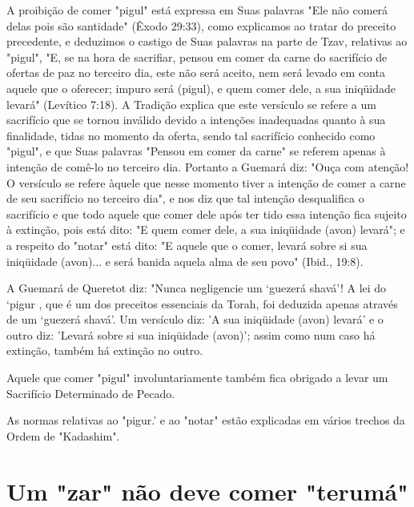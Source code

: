 \begin{itemize}
\begin{enumrate}
\begin{itemize}
\begin{itemize}
\begin{itemize}
A proibição de comer "pigul" está expressa em Suas palavras "Ele não
comerá delas pois são santidade" (Êxodo 29:33), como explicamos ao
tra­tar do preceito precedente, e deduzimos o castigo de Suas palavras
na parte de Tzav, relativas ao "pigul", "E, se na hora de sacrifiar,
pensou em comer da carne do sacrifício de ofertas de paz no terceiro
dia, este não será aceito, nem será levado em conta aquele que o
oferecer; impuro será (pigul), e quem comer dele, a sua iniqüidade
levará" (Levítico 7:18). A Tradição explica que este versículo se refere
a um sacrifício que se tornou inválido devido a intenções
inadequadas quanto à sua finalidade, tidas no momento da oferta, sendo
tal sa­crifício conhecido como "pigul", e que Suas palavras "Pensou em
comer da carne" se referem apenas à intenção de comê-lo no terceiro dia.
Portanto a Gue­mará diz: "Ouça com atenção! O versículo se refere àquele
que nesse momen­to tiver a intenção de comer a carne de seu sacrifício
no terceiro dia", e nos diz que tal intenção desqualifica o sacrifício e
que todo aquele que comer dele após ter tido essa intenção fica sujeito
à extinção, pois está dito: "E quem co­mer dele, a sua iniqüidade (avon)
levará"; e a respeito do "notar" está dito: "E aquele que o comer,
levará sobre si sua iniqüidade (avon)... e será banida aquela alma de
seu povo" (Ibid., 19:8).

A Guemará de Queretot diz: "Nunca negligencie um `guezerá sha­vá'! A lei
do `pigur , que é um dos preceitos essenciais da Torah, foi deduzida
apenas através de um `guezerá shavá'. Um versículo diz: 'A sua
iniqüidade (avon) levará' e o outro diz: 'Levará sobre si sua iniqüidade
(avon)'; assim como num caso há extinção, também há extinção no outro.

Aquele que comer "pigul" involuntariamente também fica obriga­do a levar
um Sacrifício Determinado de Pecado.

As normas relativas ao "pigur.' e ao "notar" estão explicadas em vá­rios
trechos da Ordem de "Kadashim".

\section{Um "zar" não deve comer "terumá"}



\end{itemize}
\end{itemize}
\end{itemize}
\end{enumrate}
\end{itemize}
